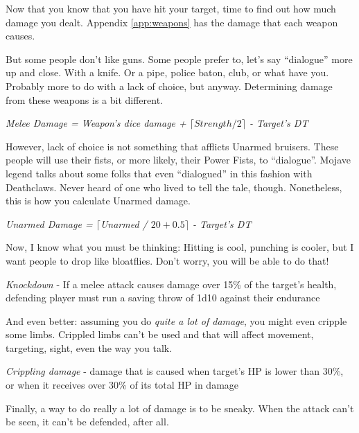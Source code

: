 \documentclass[11pt]{article} %
\begin{document}
Now that you know that you have hit your target, time to find out how much damage you dealt. Appendix \ref{app:weapons} has the damage that each weapon causes.

But some people don't like guns. Some people prefer to, let's say ``dialogue'' more up and close. With a knife. Or a pipe, police baton, club, or what have you. Probably more to do with a lack of choice, but anyway. Determining damage from these weapons is a bit different.        

\begin{center}
	\textit{Melee Damage = Weapon's dice damage + $\lceil Strength / 2 \rceil$ - Target's DT}
\end{center}

However, lack of choice is not something that afflicts Unarmed bruisers. These people will use their fists, or more likely, their Power Fists, to ``dialogue''. Mojave legend talks about some folks that even ``dialogued'' in this fashion with Deathclaws. Never heard of one who lived to tell the tale, though. Nonetheless, this is how you calculate Unarmed damage.

\begin{center}
        \textit{Unarmed Damage = $\lceil$Unarmed / $20 + 0.5\rceil$ - Target's DT}
\end{center}

Now, I know what you must be thinking: Hitting is cool, punching is cooler, but I want people to drop like bloatflies. Don't worry, you will be able to do that!

\begin{center}
	\textit{Knockdown} - If a melee attack causes damage over 15\% of the target's health, defending player must run a saving throw of 1d10 against their endurance
\end{center}

And even better: assuming you do \textit{quite a lot of damage}, you might even cripple some limbs. Crippled limbs can't be used and that will affect movement, targeting, sight, even the way you talk.

\begin{center}
        \textit{Crippling damage} - damage that is caused when target's HP is lower than 30\%, or when it receives over 30\% of its total HP in damage
\end{center}

Finally, a way to do really a lot of damage is to be sneaky. When the attack can't be seen, it can't be defended, after all.
\end{document}
